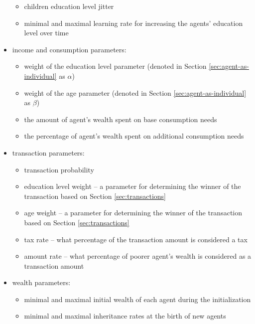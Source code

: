 \documentclass[english]{projectreport}
\begin{document}
\begin{itemize}
\begin{itemize}
                \item children education level jitter
                \item minimal and maximal learning rate for increasing the agents' education level over time
            \end{itemize}
        \item income and consumption parameters:
            \begin{itemize}
                \item weight of the education level parameter (denoted in Section \ref{sec:agent-as-individual} as $\alpha$)
                \item weight of the age parameter (denoted in Section \ref{sec:agent-as-individual} as $\beta$)
                \item the amount of agent's wealth spent on base consumption needs
                \item the percentage of agent's wealth spent on additional consumption needs
            \end{itemize}
        \item transaction parameters:
            \begin{itemize}
                \item transaction probability
                \item education level weight – a parameter for determining the winner of the transaction based on Section \ref{sec:transactions}
                \item age weight – a parameter for determining the winner of the transaction based on Section \ref{sec:transactions}
                \item tax rate – what percentage of the transaction amount is considered a tax
                \item amount rate – what percentage of poorer agent's wealth is considered as a transaction amount
            \end{itemize}
        \item wealth parameters:
            \begin{itemize}
                \item minimal and maximal initial wealth of each agent during the initialization
                \item minimal and maximal inheritance rates at the birth of new agents 
            \end{itemize}
    \end{itemize}
\end{document}
